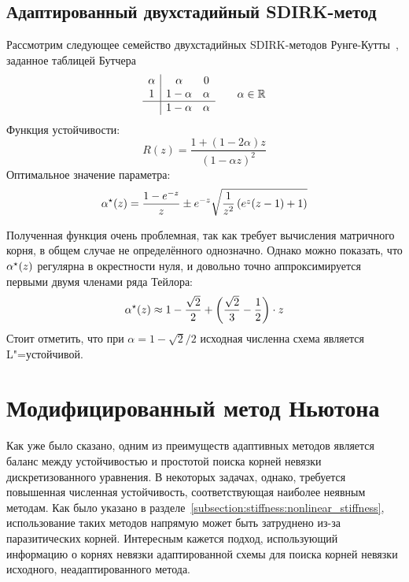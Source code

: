\subsection{Адаптированный двухстадийный SDIRK-метод}
\label{subsection:exponential_fitting:two_stage_SDIRK}

Рассмотрим следующее семейство двухстадийных SDIRK-методов Рунге-Кутты~\cite{franko1997SDIRK},
заданное таблицей Бутчера
\[
    \begin{array}{c|cc}
        \alpha & \alpha & 0 \\
        1      & 1 - \alpha & \alpha \\
        \hline
         & 1 - \alpha & \alpha
    \end{array}
    \qquad
    \alpha \in \mathbb{R}
\]
Функция устойчивости:
\[
    R(z) = \frac{1 + (1 - 2 \alpha) z}{(1 - \alpha z)^2}
\]
Оптимальное значение параметра:
%
\begin{equation}
    \label{eq:two_stage_SDIRK:optimal_parameters}
    \alpha^\star(z) = \frac{1 - e^{-z}}{z} \pm e^{-z} \sqrt{\frac{1}{z^2} \left( e^z (z - 1) + 1 \right)}
\end{equation}

Полученная функция очень проблемная,
так как требует вычисления матричного корня,
в общем случае не определённого однозначно.
Однако можно показать, что $ \alpha^\star(z) $ регулярна в окрестности нуля,
и довольно точно аппроксимируется первыми двумя членами ряда Тейлора:
\[
    \alpha^\star(z) \approx 1 - \frac{\sqrt{2}}{2} + \left( \frac{\sqrt{2}}{3} - \frac{1}{2} \right) \cdot z
\]
Стоит отметить, что при $ \alpha = 1 - \sqrt{2} / 2 $ исходная численна схема является L"=устойчивой.


\section{Модифицированный метод Ньютона}
\label{section:methods:modified_Newton_iteration}

Как уже было сказано, одним из преимуществ адаптивных методов является баланс между устойчивостью
и простотой поиска корней невязки дискретизованного уравнения.
В некоторых задачах, однако, требуется повышенная численная устойчивость,
соответствующая наиболее неявным методам.
Как было указано в разделе~\ref{subsection:stiffness:nonlinear_stiffness},
использование таких методов напрямую может быть затруднено из-за паразитических корней.
Интересным кажется подход,
использующий информацию о корнях невязки адаптированной схемы
для поиска корней невязки исходного, неадаптированного метода.

